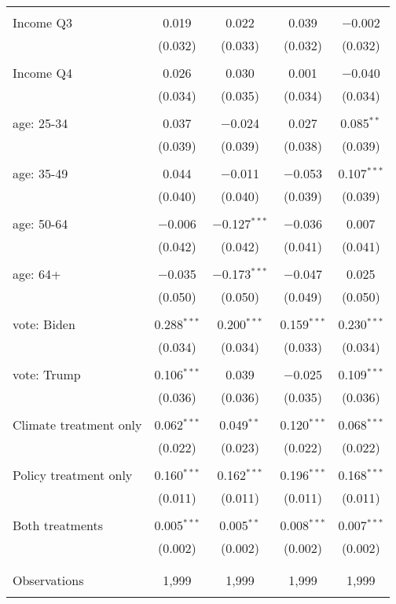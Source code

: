 \begin{tabular}{@{\extracolsep{5pt}}lcccc}
  & & & & \\ 
 Income Q3 & 0.019 & 0.022 & 0.039 & $-$0.002 \\ 
  & (0.032) & (0.033) & (0.032) & (0.032) \\ 
  & & & & \\ 
 Income Q4 & 0.026 & 0.030 & 0.001 & $-$0.040 \\ 
  & (0.034) & (0.035) & (0.034) & (0.034) \\ 
  & & & & \\ 
 age: 25-34 & 0.037 & $-$0.024 & 0.027 & 0.085$^{**}$ \\ 
  & (0.039) & (0.039) & (0.038) & (0.039) \\ 
  & & & & \\ 
 age: 35-49 & 0.044 & $-$0.011 & $-$0.053 & 0.107$^{***}$ \\ 
  & (0.040) & (0.040) & (0.039) & (0.039) \\ 
  & & & & \\ 
 age: 50-64 & $-$0.006 & $-$0.127$^{***}$ & $-$0.036 & 0.007 \\ 
  & (0.042) & (0.042) & (0.041) & (0.041) \\ 
  & & & & \\ 
 age: 64+ & $-$0.035 & $-$0.173$^{***}$ & $-$0.047 & 0.025 \\ 
  & (0.050) & (0.050) & (0.049) & (0.050) \\ 
  & & & & \\ 
 vote: Biden & 0.288$^{***}$ & 0.200$^{***}$ & 0.159$^{***}$ & 0.230$^{***}$ \\ 
  & (0.034) & (0.034) & (0.033) & (0.034) \\ 
  & & & & \\ 
 vote: Trump & 0.106$^{***}$ & 0.039 & $-$0.025 & 0.109$^{***}$ \\ 
  & (0.036) & (0.036) & (0.035) & (0.036) \\ 
  & & & & \\ 
 Climate treatment only & 0.062$^{***}$ & 0.049$^{**}$ & 0.120$^{***}$ & 0.068$^{***}$ \\ 
  & (0.022) & (0.023) & (0.022) & (0.022) \\ 
  & & & & \\ 
 Policy treatment only & 0.160$^{***}$ & 0.162$^{***}$ & 0.196$^{***}$ & 0.168$^{***}$ \\ 
  & (0.011) & (0.011) & (0.011) & (0.011) \\ 
  & & & & \\ 
 Both treatments & 0.005$^{***}$ & 0.005$^{**}$ & 0.008$^{***}$ & 0.007$^{***}$ \\ 
  & (0.002) & (0.002) & (0.002) & (0.002) \\ 
  & & & & \\ 
\hline \\[-1.8ex] 

Observations & 1,999 & 1,999 & 1,999 & 1,999 \\ 
\hline 
\hline \\[-1.8ex] 
\end{tabular} 